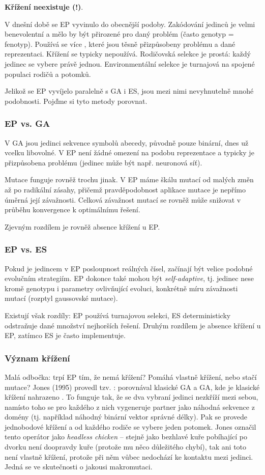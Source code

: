 \textbf{Křížení neexistuje (!)}. 

V dnešní době se EP vyvinulo do obecnější podoby. Zakódování jedinců je velmi benevolentní a mělo by být přirozené pro daný problém (často genotyp = fenotyp). Používá se více , které jsou těsně přizpůsobeny problému a dané reprezentaci. Křížení se typicky nepoužívá. Rodičovská selekce je prostá: každý jedinec se vybere právě jednou. Environmentální selekce je turnajová na spojené populaci rodičů a potomků.

Jelikož se EP vyvíjelo paralelně s GA i ES, jsou mezi nimi nevyhnutelně mnohé podobnosti. Pojďme si tyto metody porovnat.

\subsubsection{EP vs. GA}
V GA jsou jedinci sekvence symbolů abecedy, původně pouze binární, dnes už vcelku libovolné. V EP není žádné omezení na podobu reprezentace a typicky je přizpůsobena problému (jedinec může být např. neuronová síť). 

Mutace funguje rovněž trochu jinak. V EP máme škálu mutací od malých změn až po radikální zásahy, přičemž pravděpodobnost aplikace mutace je nepřímo úměrná její závažnosti. Celková závažnost mutací se rovněž může snižovat v průběhu konvergence k optimálnímu řešení.

Zjevným rozdílem je rovněž absence křížení u EP.

\subsubsection{EP vs. ES}
Pokud je jedincem v EP posloupnost reálných čísel, začínají být velice podobné evolučním strategiím. EP dokonce také mohou být \textit{self-adaptive}, tj. jedinec nese kromě genotypu i parametry ovlivňující evoluci, konkrétně míru závažnosti mutací (rozptyl gaussovské mutace).

Existují však rozdíly: EP používá turnajovou selekci, ES deterministicky odstraňuje dané množství nejhorších řešení. Druhým rozdílem je absence křížení u EP, zatímco ES je často implementuje. 

\subsubsection{Význam křížení}
Malá odbočka: trpí EP tím, že nemá křížení? Pomáhá vlastně křížení, nebo stačí mutace? Jones (1995) provedl tzv. : porovnával klasické GA a GA, kde je klasické křížení nahrazeno . To funguje tak, že se dva vybraní jedinci nezkříží mezi sebou, namísto toho se pro každého z nich vygeneruje partner jako náhodná sekvence z domény (tj. například náhodný binární vektor správné délky). Pak se provede jednobodové křížení a od každého rodiče se vybere jeden potomek. Jones označil tento operátor jako \textit{headless chicken} -- stejně jako bezhlavé kuře pobíhající po dvorku není doopravdy kuře (protože mu něco důležitého chybí), tak ani toto  není vlastně křížení, protože při něm vůbec nedochází ke kontaktu mezi jedinci. Jedná se ve skutečnosti o jakousi makromutaci.


